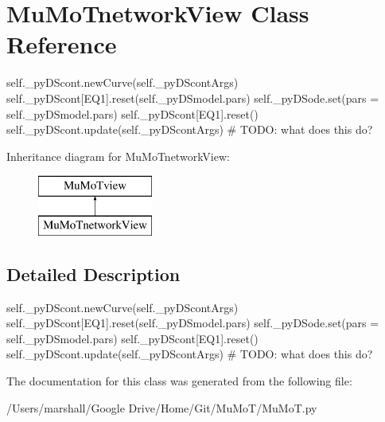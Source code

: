 \hypertarget{class_mu_mo_t_1_1_mu_mo_tnetwork_view}{}\section{Mu\+Mo\+Tnetwork\+View Class Reference}
\label{class_mu_mo_t_1_1_mu_mo_tnetwork_view}


self.\+\_\+py\+D\+Scont.\+new\+Curve(self.\+\_\+py\+D\+Scont\+Args) self.\+\_\+py\+D\+Scont\mbox{[}\textquotesingle{}E\+Q1\textquotesingle{}\mbox{]}.reset(self.\+\_\+py\+D\+Smodel.\+pars) self.\+\_\+py\+D\+Sode.\+set(pars = self.\+\_\+py\+D\+Smodel.\+pars) self.\+\_\+py\+D\+Scont\mbox{[}\textquotesingle{}E\+Q1\textquotesingle{}\mbox{]}.reset() self.\+\_\+py\+D\+Scont.\+update(self.\+\_\+py\+D\+Scont\+Args) \# T\+O\+DO\+: what does this do?  


Inheritance diagram for Mu\+Mo\+Tnetwork\+View\+:\begin{figure}[H]
\begin{center}
\leavevmode
\includegraphics[height=2.000000cm]{class_mu_mo_t_1_1_mu_mo_tnetwork_view}
\end{center}
\end{figure}


\subsection{Detailed Description}
self.\+\_\+py\+D\+Scont.\+new\+Curve(self.\+\_\+py\+D\+Scont\+Args) self.\+\_\+py\+D\+Scont\mbox{[}\textquotesingle{}E\+Q1\textquotesingle{}\mbox{]}.reset(self.\+\_\+py\+D\+Smodel.\+pars) self.\+\_\+py\+D\+Sode.\+set(pars = self.\+\_\+py\+D\+Smodel.\+pars) self.\+\_\+py\+D\+Scont\mbox{[}\textquotesingle{}E\+Q1\textquotesingle{}\mbox{]}.reset() self.\+\_\+py\+D\+Scont.\+update(self.\+\_\+py\+D\+Scont\+Args) \# T\+O\+DO\+: what does this do? 

The documentation for this class was generated from the following file\+:\begin{DoxyCompactItemize}
\item 
/\+Users/marshall/\+Google Drive/\+Home/\+Git/\+Mu\+Mo\+T/Mu\+Mo\+T.\+py\end{DoxyCompactItemize}
